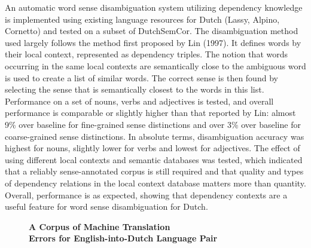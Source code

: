 \documentclass[10pt, a4paper, twopage, headinclude, footinclude, BCOR5mm]{scrartcl}
\begin{document}
\noindent
An automatic word sense disambiguation system utilizing dependency knowledge is implemented using existing language resources for Dutch (Lassy, Alpino, Cornetto) and tested on a subset of DutchSemCor. The disambiguation method used largely follows the method first proposed by Lin (1997). It defines words by their local context, represented as dependency triples. The notion that words occurring in the same local contexts are semantically close to the ambiguous word is used to create a list of similar words. The correct sense is then found by selecting the sense that is semantically closest to the words in this list. Performance on a set of nouns, verbs and adjectives is tested, and overall performance is comparable or slightly higher than that reported by Lin: almost 9\% over baseline for fine-grained sense distinctions and over 3\% over baseline for coarse-grained sense distinctions. In absolute terms, disambiguation accuracy was highest for nouns, slightly lower for verbs and lowest for adjectives. The effect of using different local contexts and semantic databases was tested, which indicated that a reliably sense-annotated corpus is still required and that quality and types of dependency relations in the local context database matters more than quantity. Overall, performance is as expected, showing that dependency contexts are a useful feature for word sense disambiguation for Dutch.


\newpage

\begin{figure}[t!]
\centering
\large\textbf{A Corpus of Machine Translation \\ Errors for English-into-Dutch Language Pair}
\vspace*{0.5cm}
\end{figure}


        \begin{table}[t!]
    \end{table}
        \begin{table}[t!]
    \end{table}
\end{document}
